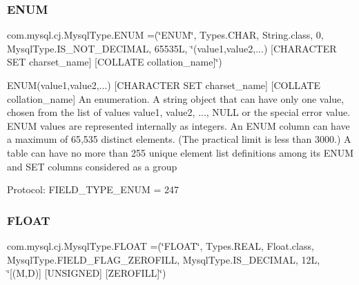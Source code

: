 \subsubsection{\texorpdfstring{E\+N\+UM}{ENUM}}
{\footnotesize\ttfamily com.\+mysql.\+cj.\+Mysql\+Type.\+E\+N\+UM =(\char`\"{}E\+N\+UM\char`\"{}, Types.\+C\+H\+AR, String.\+class, 0, Mysql\+Type.\+I\+S\+\_\+\+N\+O\+T\+\_\+\+D\+E\+C\+I\+M\+AL, 65535\+L, \char`\"{}(\textquotesingle{}value1\textquotesingle{},\textquotesingle{}value2\textquotesingle{},...) \mbox{[}\+C\+H\+A\+R\+A\+C\+T\+E\+R S\+E\+T charset\+\_\+name\mbox{]} \mbox{[}\+C\+O\+L\+L\+A\+T\+E collation\+\_\+name\mbox{]}\char`\"{})}

E\+N\+UM(\textquotesingle{}value1\textquotesingle{},\textquotesingle{}value2\textquotesingle{},...) \mbox{[}C\+H\+A\+R\+A\+C\+T\+ER S\+ET charset\+\_\+name\mbox{]} \mbox{[}C\+O\+L\+L\+A\+TE collation\+\_\+name\mbox{]} An enumeration. A string object that can have only one value, chosen from the list of values \textquotesingle{}value1\textquotesingle{}, \textquotesingle{}value2\textquotesingle{}, ..., N\+U\+LL or the special \textquotesingle{}\textquotesingle{} error value. E\+N\+UM values are represented internally as integers. An E\+N\+UM column can have a maximum of 65,535 distinct elements. (The practical limit is less than 3000.) A table can have no more than 255 unique element list definitions among its E\+N\+UM and S\+ET columns considered as a group

Protocol\+: F\+I\+E\+L\+D\+\_\+\+T\+Y\+P\+E\+\_\+\+E\+N\+UM = 247 \mbox{\label{enumcom_1_1mysql_1_1cj_1_1_mysql_type_ae8cf970114766445c4e064ee748fb74c}} 
\subsubsection{\texorpdfstring{F\+L\+O\+AT}{FLOAT}}
{\footnotesize\ttfamily com.\+mysql.\+cj.\+Mysql\+Type.\+F\+L\+O\+AT =(\char`\"{}F\+L\+O\+AT\char`\"{}, Types.\+R\+E\+AL, Float.\+class, Mysql\+Type.\+F\+I\+E\+L\+D\+\_\+\+F\+L\+A\+G\+\_\+\+Z\+E\+R\+O\+F\+I\+LL, Mysql\+Type.\+I\+S\+\_\+\+D\+E\+C\+I\+M\+AL, 12\+L, \char`\"{}\mbox{[}(\+M,\+D)\mbox{]} \mbox{[}\+U\+N\+S\+I\+G\+N\+E\+D\mbox{]} \mbox{[}\+Z\+E\+R\+O\+F\+I\+L\+L\mbox{]}\char`\"{})}

